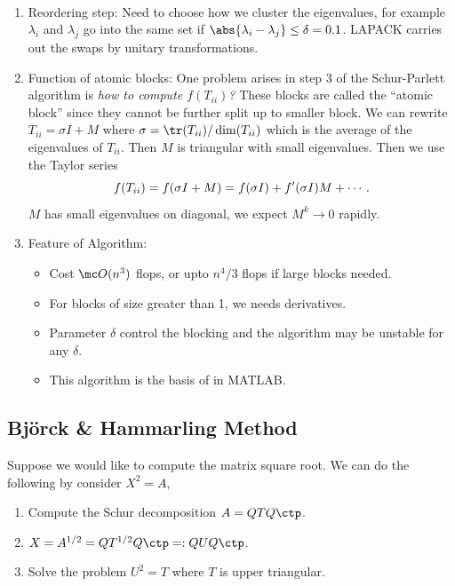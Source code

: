 \documentclass{article}
\begin{document}
\begin{remark}
    \ 
    \begin{enumerate}
        \item Reordering step: Need to choose how we cluster the
        eigenvalues, for example $\lambda_i$ and $\lambda_j$ go into the
        same set if $\abs{\lambda_i - \lambda_j} \leq \delta = 0.1$.
        LAPACK carries out the swaps by unitary transformations.
        \item Function of atomic blocks: One problem arises in step 3 of
        the Schur-Parlett algorithm is \emph{how to compute
        $f(T_{ii})$?} These blocks are called the ``atomic block'' since
        they cannot be further split up to smaller block. We can rewrite
        $T_{ii} = \sigma I + M$ where $\sigma =
        \tr(T_{ii})/\dim(T_{ii})$ which is the average of the
        eigenvalues of $T_{ii}$. Then $M$ is triangular with small
        eigenvalues. Then we use the Taylor series 
        \begin{equation}\notag
            f(T_{ii}) = f(\sigma I + M) = f(\sigma I) + f'(\sigma I)M + \cdots.
        \end{equation}
        $M$ has small eigenvalues on diagonal, we expect $M^k\to 0$
        rapidly.
        \item 
        Feature of Algorithm:
        \begin{itemize}
            \item Cost $\mc O(n^3)$ flops, or upto $n^4/3$ flops if
            large blocks needed.
            \item For blocks of size greater than 1, we needs
            derivatives.
            \item Parameter $\delta$ control the blocking and the
            algorithm may be unstable for any $\delta$.
            \item This algorithm is the basis of  in
            MATLAB.
        \end{itemize}
    \end{enumerate}
\end{remark}


\subsection{Bj\"orck \& Hammarling Method}
Suppose we would like to compute the matrix square root. We can do the
following by consider $X^2 = A$,
\begin{enumerate}
    \item Compute the Schur decomposition $A = QTQ\ctp$.
    \item $X = A^{1/2} = QT^{1/2}Q\ctp =: Q U Q\ctp$.
    \item Solve the problem $U^2 = T$ where $T$ is upper triangular.
\end{enumerate}
\end{document}
